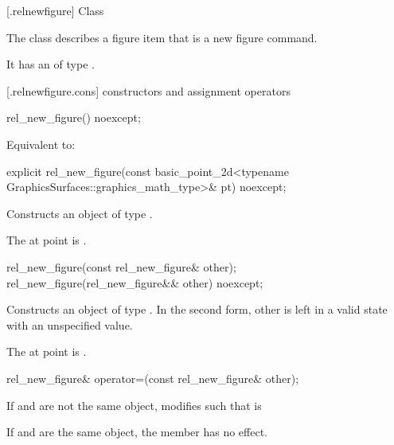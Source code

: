  [\iotwod.relnewfigure] {Class }%

\pnum
{}%
The class  describes a figure item that is a new figure command.

\pnum
It has an  of type .

 [\iotwod.relnewfigure.cons] { constructors and assignment operators}%

%
\begin{itemdecl}
rel_new_figure() noexcept;
\end{itemdecl}
\begin{itemdescr}
\pnum
\effects
Equivalent to: 
\end{itemdescr}

%
\begin{itemdecl}
explicit rel_new_figure(const basic_point_2d<typename
  GraphicsSurfaces::graphics_math_type>& pt) noexcept;
\end{itemdecl}
\begin{itemdescr}
\pnum
\effects
Constructs an object of type .

\pnum
The at point is .
\end{itemdescr}

%
\begin{itemdecl}
rel_new_figure(const rel_new_figure& other);
rel_new_figure(rel_new_figure&& other) noexcept;
\end{itemdecl}
\begin{itemdescr}
\pnum
\effects
Constructs an object of type . In the second form, other is left in a valid state with an unspecified value.

\pnum
The at point is .
\end{itemdescr}

%
\begin{itemdecl}
rel_new_figure& operator=(const rel_new_figure& other);
\end{itemdecl}
\begin{itemdescr}
\pnum
\effects
If  and  are not the same object, modifies  such that  is 

\pnum
If  and  are the same object, the member has no effect.

\pnum
\returns
{}
\end{itemdescr}

